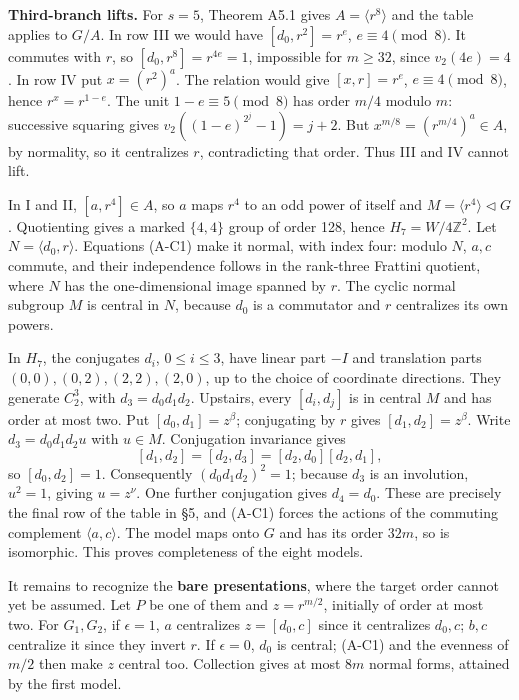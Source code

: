 \documentclass[
  11pt,
  a4paper,
]{article}
\begin{document}
\textbf{Third-branch lifts.} For \(s=5\), Theorem A5.1 gives
\(A=\langle r^8\rangle\) and the table applies to \(G/A\). In row III we
would have \([d_0,r^2]=r^e\), \(e\equiv4\pmod8\). It commutes with
\(r\), so \([d_0,r^8]=r^{4e}=1\), impossible for \(m\ge32\), since
\(v_2(4e)=4\). In row IV put \(x=(r^2)^a\). The relation would give
\([x,r]=r^e\), \(e\equiv4\pmod8\), hence \(r^x=r^{1-e}\). The unit
\(1-e\equiv5\pmod8\) has order \(m/4\) modulo \(m\): successive squaring
gives \(v_2((1-e)^{2^j}-1)=j+2\). But \(x^{m/8}=(r^{m/4})^a\in A\), by
normality, so it centralizes \(r\), contradicting that order. Thus III
and IV cannot lift.

In I and II, \([a,r^4]\in A\), so \(a\) maps \(r^4\) to an odd power of
itself and \(M=\langle r^4\rangle\lhd G\). Quotienting gives a marked
\(\{4,4\}\) group of order 128, hence \(H_7=W/4\mathbb Z^2\). Let
\(N=\langle d_0,r\rangle\). Equations (A-C1) make it normal, with index
four: modulo \(N\), \(a,c\) commute, and their independence follows in
the rank-three Frattini quotient, where \(N\) has the one-dimensional
image spanned by \(r\). The cyclic normal subgroup \(M\) is central in
\(N\), because \(d_0\) is a commutator and \(r\) centralizes its own
powers.

In \(H_7\), the conjugates \(d_i\), \(0\le i\le3\), have linear part
\(-I\) and translation parts \((0,0),(0,2),(2,2),(2,0)\), up to the
choice of coordinate directions. They generate \(C_2^3\), with
\(d_3=d_0d_1d_2\). Upstairs, every \([d_i,d_j]\) is in central \(M\) and
has order at most two. Put \([d_0,d_1]=z^\beta\); conjugating by \(r\)
gives \([d_1,d_2]=z^\beta\). Write \(d_3=d_0d_1d_2u\) with \(u\in M\).
Conjugation invariance gives \[
 [d_1,d_2]=[d_2,d_3]=[d_2,d_0][d_2,d_1],
\] so \([d_0,d_2]=1\). Consequently \((d_0d_1d_2)^2=1\); because \(d_3\)
is an involution, \(u^2=1\), giving \(u=z^\nu\). One further conjugation
gives \(d_4=d_0\). These are precisely the final row of the table in §5,
and (A-C1) forces the actions of the commuting complement
\(\langle a,c\rangle\). The model maps onto \(G\) and has its order
\(32m\), so is isomorphic. This proves completeness of the eight models.

It remains to recognize the \textbf{bare presentations}, where the
target order cannot yet be assumed. Let \(P\) be one of them and
\(z=r^{m/2}\), initially of order at most two. For \(G_1,G_2\), if
\(\epsilon=1\), \(a\) centralizes \(z=[d_0,c]\) since it centralizes
\(d_0,c\); \(b,c\) centralize it since they invert \(r\). If
\(\epsilon=0\), \(d_0\) is central; (A-C1) and the evenness of \(m/2\)
then make \(z\) central too. Collection gives at most \(8m\) normal
forms, attained by the first model.
\end{document}
